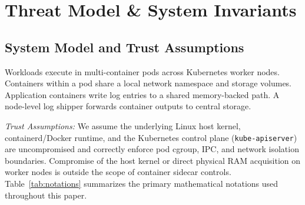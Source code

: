 \documentclass[conference]{IEEEtran}
\begin{document}
\section{Threat Model \& System Invariants}

\subsection{System Model and Trust Assumptions}
Workloads execute in multi-container pods across Kubernetes worker nodes. Containers within a pod share a local network namespace and storage volumes. Application containers write log entries to a shared memory-backed path. A node-level log shipper forwards container outputs to central storage.

\textit{Trust Assumptions:} We assume the underlying Linux host kernel, containerd/Docker runtime, and the Kubernetes control plane (\texttt{kube-apiserver}) are uncompromised and correctly enforce pod cgroup, IPC, and network isolation boundaries. Compromise of the host kernel or direct physical RAM acquisition on worker nodes is outside the scope of container sidecar controls. Table~\ref{tab:notations} summarizes the primary mathematical notations used throughout this paper.
\end{document}
